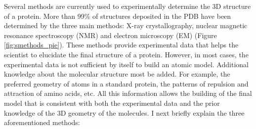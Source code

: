 \documentclass[11pt, b5paper,twoside]{tesi_upf}
\begin{document}
\par Several methods are currently used to experimentally determine the 3D structure of a protein. More than 99$\%$ of structures deposited in the PDB have been determined by the three main methods:  X-ray crystallography, nuclear magnetic resonance  spectroscopy (NMR) and electron microscopy (EM) (Figure \ref{fig:smethods_pie}). These methods provide experimental data that helps the scientist to elucidate the final structure of a protein. However, in most cases, the experimental data is not sufficient by itself to build an atomic model. Additional knowledge about the molecular structure most be added. For example, the preferred geometry of atoms in a standard protein, the patterns of repulsion and attraction of amino acids, etc. All this information allows the building of the final model that is consistent with both the experimental data and the prior knowledge of the 3D geometry of the molecules. I next briefly explain the three aforementioned methods:
\end{document}
